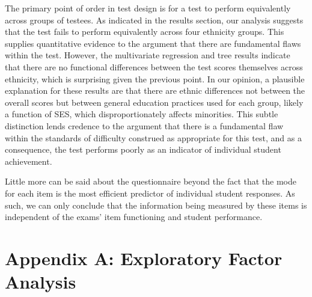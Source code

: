 \documentclass{article}\usepackage[]{graphicx}\usepackage[]{color}
\begin{document}
The primary point of order in test design is for a test to perform equivalently across groups of testees. As indicated in the results section, our analysis suggests that the test fails to perform equivalently across four ethnicity groups. This supplies quantitative evidence to the argument that there are fundamental flaws within the test. However, the multivariate regression and tree results indicate that there are no functional differences between the test scores themselves across ethnicity, which is surprising given the previous point. In our opinion, a plausible explanation for these results are that there are ethnic differences not between the overall scores but between general education practices used for each group, likely a function of SES, which disproportionately affects minorities. This subtle distinction lends credence to the argument that there is a fundamental flaw within the standards of difficulty construed as appropriate for this test, and as a consequence, the test performs poorly as an indicator of individual student achievement.

Little more can be said about the questionnaire beyond the fact that the mode for each item is the most efficient predictor of individual student responses. As such, we can only conclude that the information being measured by these items is independent of the exams' item functioning and student performance.


{}



\section{Appendix A: Exploratory Factor Analysis}
\end{document}
